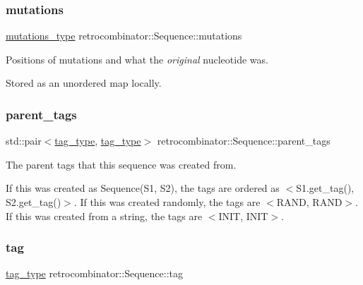 \subsubsection{\texorpdfstring{mutations}{mutations}}
{\footnotesize\ttfamily \hyperlink{classretrocombinator_1_1Sequence_a2abbaf2376f035a997e02c4afae9f476}{mutations\+\_\+type} retrocombinator\+::\+Sequence\+::mutations\hspace{0.3cm}{\ttfamily [private]}}



Positions of mutations and what the {\itshape original} nucleotide was. 

Stored as an unordered map locally. \mbox{\label{classretrocombinator_1_1Sequence_a023fef0801bd63048bf5c7b2442694cc}} 
\subsubsection{\texorpdfstring{parent\+\_\+tags}{parent\_tags}}
{\footnotesize\ttfamily std\+::pair$<$\hyperlink{namespaceretrocombinator_afd7c6eb4293e8c4d12827609a9a34b9b}{tag\+\_\+type}, \hyperlink{namespaceretrocombinator_afd7c6eb4293e8c4d12827609a9a34b9b}{tag\+\_\+type}$>$ retrocombinator\+::\+Sequence\+::parent\+\_\+tags\hspace{0.3cm}{\ttfamily [private]}}



The parent tags that this sequence was created from. 

If this was created as Sequence(\+S1, S2), the tags are ordered as $<$S1.\+get\+\_\+tag(), S2.\+get\+\_\+tag()$>$. If this was created randomly, the tags are $<$R\+A\+ND, R\+A\+ND$>$. If this was created from a string, the tags are $<$I\+N\+IT, I\+N\+IT$>$. \mbox{\label{classretrocombinator_1_1Sequence_ae599e85a84a78e23d33f6c3085248726}} 
\subsubsection{\texorpdfstring{tag}{tag}}
{\footnotesize\ttfamily \hyperlink{namespaceretrocombinator_afd7c6eb4293e8c4d12827609a9a34b9b}{tag\+\_\+type} retrocombinator\+::\+Sequence\+::tag\hspace{0.3cm}{\ttfamily [private]}}




